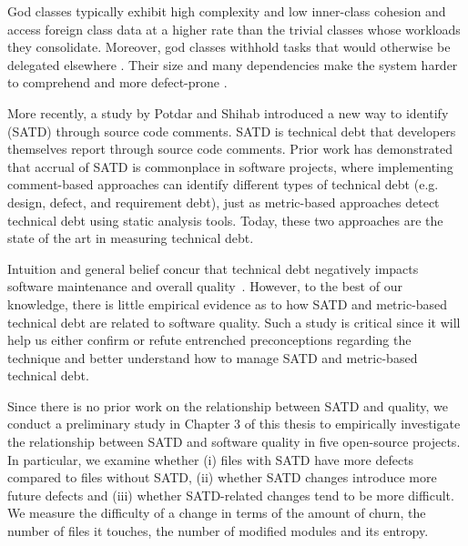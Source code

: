 God classes typically exhibit high complexity and low inner-class cohesion and access foreign class data at a higher rate than the trivial classes whose workloads they consolidate. Moreover, god classes withhold tasks that would otherwise be delegated elsewhere \cite{lanza2007object}. Their size and many dependencies make the system harder to comprehend and more defect-prone \cite{fowler1999refactoring}.

More recently, a study by Potdar and Shihab \cite{ICSM_PotdarS14} introduced a new way to identify \SATD (SATD) through source code comments. SATD is technical debt that developers themselves report through source code comments. Prior work \cite{MTD15p9} has demonstrated that accrual of SATD is commonplace in software projects, where implementing comment-based approaches can identify different types of technical debt (e.g. design, defect, and requirement debt), just as metric-based approaches detect technical debt using static analysis tools. Today, these two approaches are the state of the art in measuring technical debt.\par



Intuition and general belief concur that technical debt negatively impacts software maintenance and overall quality~\cite{zazworka2011investigating,spinola2013investigating,GuoSGCTSSS11,seaman2015technical,kruchten2013technical}. However, to the best of our knowledge, there is little empirical evidence as to how SATD and metric-based technical debt are related to software quality. Such a study is critical since it will help us either confirm or refute entrenched preconceptions regarding the technique and better understand how to manage SATD and metric-based technical debt.\par



Since there is no prior work on the relationship between SATD and quality, we conduct a preliminary study in Chapter 3 of this thesis to empirically investigate the relationship between SATD and software quality in five open-source projects. In particular, we examine whether (i) files with SATD have more defects compared to files without SATD, (ii) whether SATD changes introduce more future defects and (iii) whether SATD-related changes tend to be more difficult. We measure the difficulty of a change in terms of the amount of churn, the number of files it touches, the number of modified modules and its entropy. \par

